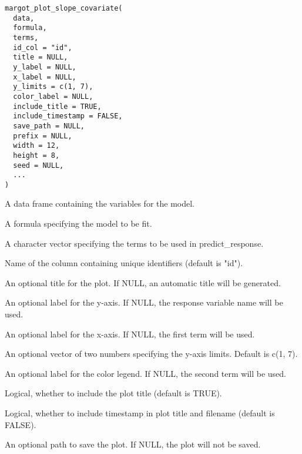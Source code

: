 \documentclass[a4paper]{book}
\begin{document}
%
\begin{Usage}
\begin{verbatim}
margot_plot_slope_covariate(
  data,
  formula,
  terms,
  id_col = "id",
  title = NULL,
  y_label = NULL,
  x_label = NULL,
  y_limits = c(1, 7),
  color_label = NULL,
  include_title = TRUE,
  include_timestamp = FALSE,
  save_path = NULL,
  prefix = NULL,
  width = 12,
  height = 8,
  seed = NULL,
  ...
)
\end{verbatim}
\end{Usage}
%
\begin{Arguments}
\begin{ldescription}
\item[\code{data}] A data frame containing the variables for the model.

\item[\code{formula}] A formula specifying the model to be fit.

\item[\code{terms}] A character vector specifying the terms to be used in predict\_response.

\item[\code{id\_col}] Name of the column containing unique identifiers (default is "id").

\item[\code{title}] An optional title for the plot. If NULL, an automatic title will be generated.

\item[\code{y\_label}] An optional label for the y-axis. If NULL, the response variable name will be used.

\item[\code{x\_label}] An optional label for the x-axis. If NULL, the first term will be used.

\item[\code{y\_limits}] An optional vector of two numbers specifying the y-axis limits. Default is c(1, 7).

\item[\code{color\_label}] An optional label for the color legend. If NULL, the second term will be used.

\item[\code{include\_title}] Logical, whether to include the plot title (default is TRUE).

\item[\code{include\_timestamp}] Logical, whether to include timestamp in plot title and filename (default is FALSE).

\item[\code{save\_path}] An optional path to save the plot. If NULL, the plot will not be saved.


\end{ldescription}
\end{Arguments}
\end{document}
